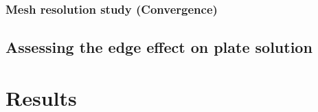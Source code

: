 \documentclass[preprint, letterpaper, nobibnotes, aps, superscriptaddress,prb]{revtex4-1}
\begin{document}
% 
% 
% 
% 
% 
% 
% 
% 
% 
% 




\subsubsection{Mesh resolution study (Convergence)}
\subsection{Assessing the edge effect on plate solution}

\section{Results}


\end{document}
